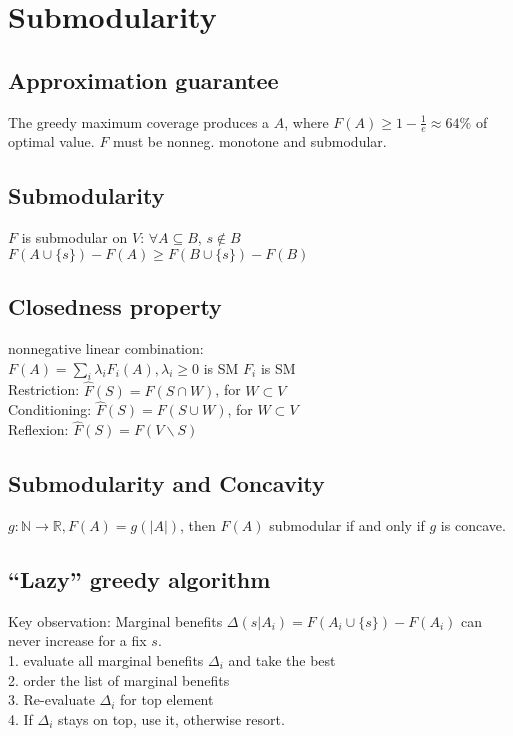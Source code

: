 \section{Submodularity}
\subsection*{Approximation guarantee}
The greedy maximum coverage produces a $A$, where $F(A) \geq 1-\frac{1}{e} \approx 64\%$ of optimal value. $F$ must be nonneg. monotone and submodular.

\subsection*{Submodularity}
$F$ is submodular on $V$: $\forall A \subseteq B$, $s \not \in B$\\
$F(A \cup \{s\}) - F(A) \geq F(B \cup \{s\})-F(B)$

\subsection*{Closedness property}
nonnegative linear combination:\\
$F(A) = \sum_i \lambda_i F_i(A), \lambda_i \geq 0$ is SM \Leftrightarrow $F_i$ is SM\\
Restriction: $\hat{F}(S) = F(S \cap W)$, for $W \subset V$\\
Conditioning: $\hat{F}(S) = F(S \cup W)$, for $W \subset V$\\
Reflexion: $\hat{F}(S) = F(V \backslash S)$

\subsection*{Submodularity and Concavity}
$g: \mathbb{N} \rightarrow \mathbb{R}, F(A) = g(|A|)$, then $F(A)$ submodular if and only if $g$ is concave.

\subsection*{``Lazy'' greedy algorithm}
Key observation: Marginal benefits $\Delta(s|A_i) = F(A_i \cup \{s\}) -F(A_i)$ can never increase for a fix $s$.\\
1. evaluate all marginal benefits $\Delta_i$ and take the best\\
2. order the list of marginal benefits\\
3. Re-evaluate $\Delta_i$ for top element\\
4. If $\Delta_i$ stays on top, use it, otherwise resort.
